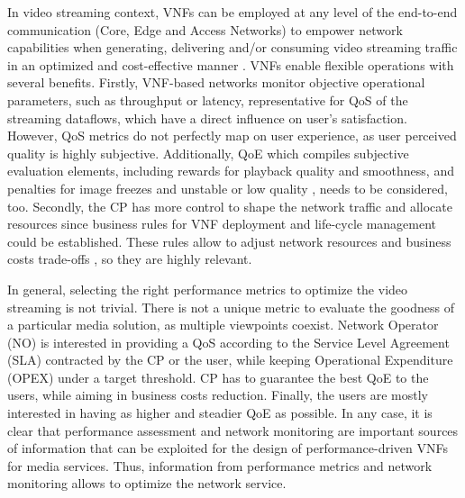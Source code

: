 In video streaming context, VNFs can be employed at any level of the end-to-end communication (Core, Edge and Access Networks) to empower network capabilities when generating, delivering and/or consuming video streaming traffic in an optimized and cost-effective manner \cite{Jahromi2018, Dieye2018}. VNFs enable flexible operations with several benefits. Firstly, VNF-based networks monitor objective operational parameters, such as throughput or latency, representative for QoS of the streaming dataflows, which have a direct influence on user's satisfaction.
However, QoS metrics do not perfectly map on user experience, as user perceived quality is highly subjective. Additionally, QoE which compiles subjective evaluation elements, including rewards for playback quality and smoothness, and penalties for image freezes and unstable or low quality \cite{Kim2010, Alreshoodi2013}, needs to be considered, too.
Secondly, the CP has more control to shape the network traffic and allocate resources since business rules for VNF deployment and life-cycle management could be established. These rules allow to adjust network resources and business costs trade-offs \cite{Hernandez2015}, so they are highly relevant.

In general, selecting the right performance metrics to optimize the video streaming is not trivial. There is not a unique metric to evaluate the goodness of a particular media solution, as multiple viewpoints coexist. Network Operator (NO) is interested in providing a QoS according to the Service Level Agreement (SLA) contracted by the CP or the user, while keeping Operational Expenditure (OPEX) under a target threshold.
CP has to guarantee the best QoE to the users, while aiming in business costs reduction.
Finally, the users are mostly interested in having as higher and steadier QoE as possible.
In any case, it is clear that performance assessment and network monitoring are important sources of information that can be exploited for the design of performance-driven VNFs for media services. Thus, information from performance metrics and network monitoring allows to optimize the network service.

